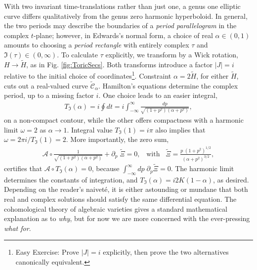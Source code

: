 \documentclass[nofootinbib,preprint]{revtex4-1}
\begin{document}
With two invariant time-translations rather than just one, a genus one elliptic curve 
differs qualitatively from the genus zero harmonic hyperboloid. In general, the two periods may describe the 
boundaries of a \textit{period parallelogram} in the complex $t$-plane; however, in Edwards's normal 
form, a choice of real $\alpha \in (0,1)$ amounts to choosing a \textit{period rectangle} with entirely 
complex $\tau$ and $\mathfrak{I}(\tau) \in (0,\infty)$. To calculate $\tau$ explicitly, we transform 
by a Wick rotation, $H \rightarrow \widetilde{H}$, as in Fig. \ref{fig:ToricSecs}. Both transforms 
introduce a factor $|J|=i$ relative to the initial choice of coordinates\footnote{
Easy Exercise: Prove $|J|=i$ explicitly, then prove the two alternatives canonically equivalent.}.
Constraint $\alpha=2\widetilde{H}$, for either $\widetilde{H}$, cuts out a real-valued curve 
$\widetilde{\mathcal{C}}_{\alpha}$. Hamilton's equations determine the complex period, 
up to a missing factor $i$. One choice leads to an easier integral,
\begin{eqnarray}
T_{\mathfrak{I}}(\alpha) = i \oint dt = i \int_{-\infty}^{\infty} \frac{dp}{\sqrt{(1+p^2)(\alpha+p^2)}},  \nonumber 
\end{eqnarray}
on a non-compact contour, while the other offers compactness with a harmonic limit 
$\omega=2$ as $\alpha \rightarrow 1$. Integral value $T_{\mathfrak{I}}(1) = i \pi$ also 
implies that $\omega = 2\pi i/T_{\mathfrak{I}}(1) =2$.  More importantly, the zero sum, 
\begin{eqnarray}\mathcal{A} \circ \frac{1}{\sqrt{(1+p^2)(\alpha+p^2)}} 
+ \partial_p \; \widetilde{\Xi} = 0, \;\;\;\text{with}\;\;\; 
\widetilde{\Xi} = \frac{p\;(1+p^2)^{1/2}}{(\alpha+p^2)^{3/2}},  \nonumber
\end{eqnarray}
certifies that $\mathcal{A} \circ T_{\mathfrak{I}}(\alpha)=0$, because
$\int_{-\infty}^{\infty} dp \; \partial_{p} \widetilde{\Xi}=0$. The harmonic 
limit determines the constants of integration, and $T_{\mathfrak{I}}(\alpha) = i 2K(1-\alpha)$,
as desired. Depending on the reader's naivet\'{e}, it is either astounding or mundane that 
both real and complex solutions should satisfy the same differential equation. The 
cohomological theory of algebraic varieties gives a standard mathematical explanation
as to \textit{why}, but for now we are more concerned with the ever-pressing 
\textit{what for}.
\end{document}
